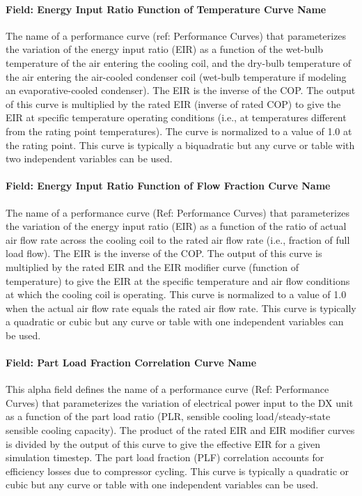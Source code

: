 \paragraph{Field: Energy Input Ratio Function of Temperature Curve Name}\label{field-energy-input-ratio-function-of-temperature-curve-name}

The name of a performance curve (ref: Performance Curves) that parameterizes the variation of the energy input ratio (EIR) as a function of the wet-bulb temperature of the air entering the cooling coil, and the dry-bulb temperature of the air entering the air-cooled condenser coil (wet-bulb temperature if modeling an evaporative-cooled condenser). The EIR is the inverse of the COP. The output of this curve is multiplied by the rated EIR (inverse of rated COP) to give the EIR at specific temperature operating conditions (i.e., at temperatures different from the rating point temperatures). The curve is normalized to a value of 1.0 at the rating point. This curve is typically a biquadratic but any curve or table with two independent variables can be used.

\paragraph{Field: Energy Input Ratio Function of Flow Fraction Curve Name}\label{field-energy-input-ratio-function-of-flow-fraction-curve-name}

The name of a performance curve (Ref: Performance Curves) that parameterizes the variation of the energy input ratio (EIR) as a function of the ratio of actual air flow rate across the cooling coil to the rated air flow rate (i.e., fraction of full load flow). The EIR is the inverse of the COP. The output of this curve is multiplied by the rated EIR and the EIR modifier curve (function of temperature) to give the EIR at the specific temperature and air flow conditions at which the cooling coil is operating. This curve is normalized to a value of 1.0 when the actual air flow rate equals the rated air flow rate. This curve is typically a quadratic or cubic but any curve or table with one independent variables can be used.

\paragraph{Field: Part Load Fraction Correlation Curve Name}\label{field-part-load-fraction-correlation-curve-name-2}

This alpha field defines the name of a performance curve (Ref: Performance Curves) that parameterizes the variation of electrical power input to the DX unit as a function of the part load ratio (PLR, sensible cooling load/steady-state sensible cooling capacity). The product of the rated EIR and EIR modifier curves is divided by the output of this curve to give the effective EIR for a given simulation timestep. The part load fraction (PLF) correlation accounts for efficiency losses due to compressor cycling. This curve is typically a quadratic or cubic but any curve or table with one independent variables can be used.

